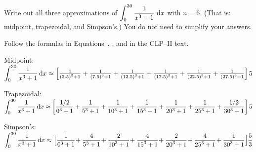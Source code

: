 \subsection*{\Procedural}
\begin{Mquestion}\label{prob_s1.11_int1}
Write out all three approximations of $\displaystyle\int_0^{30} \frac{1}{x^3+1}~\mathrm{d}x$ with $n=6$. (That is: midpoint, trapezoidal, and Simpson's.) You do not need to simplify your answers.
\end{Mquestion}
\begin{hint}
Follow the formulas in Equations~,
, and  in the CLP--II text.
\end{hint}
\begin{answer}

Midpoint:\\[10pt]
$\displaystyle
\int_0^{30} \frac{1}{x^3+1}\,\mathrm{d}x\approx\left[\tfrac{1}{\left(2.5\right)^3+1}
+\tfrac{1}{\left(7.5\right)^3+1}
+\tfrac{1}{\left(12.5\right)^3+1}
+\tfrac{1}{\left(17.5\right)^3+1}
+\tfrac{1}{\left(22.5\right)^3+1}
+\tfrac{1}{\left(27.5\right)^3+1}
\right]5
$

Trapezoidal:\\[10pt]
$\displaystyle\int_0^{30} \frac{1}{x^3+1}\,\mathrm{d}x
\approx\left[
\frac{1/2}{0^3+1}+
\frac{1}{5^3+1}+
\frac{1}{10^3+1}+
\frac{1}{15^3+1}+
\frac{1}{20^3+1}+
\frac{1}{25^3+1}+
\frac{1/2}{30^3+1}
\right]5$

Simpson's:\\[10pt]
$
\displaystyle\int_0^{30} \frac{1}{x^3+1}\,\mathrm{d}x\approx
\Big[\frac{1}{{0}^3+1}\!+\frac{4}{{5}^3+1}\!+\frac{2}{{10}^3+1}\!+\frac{4}{{15}^3+1}\!+\frac{2}{{20}^3+1}\!+\frac{4}{{25}^3+1}\!+ \frac{1}{{30}^3+1}\Big]\frac{5}{3}
$
\end{answer}

